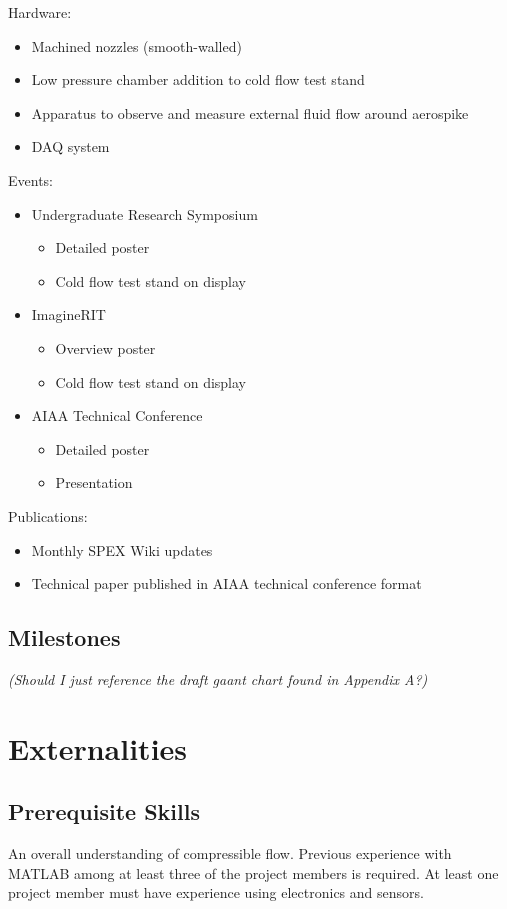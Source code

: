 \documentclass[conference]{IEEEtran} %
\begin{document}
	Hardware:
	\begin{itemize}
		\item Machined nozzles (smooth-walled)
		\item Low pressure chamber addition to cold flow test stand
		\item Apparatus to observe and measure external fluid flow around aerospike
		\item DAQ system
	\end{itemize}
	Events:
	\begin{itemize}
		\item Undergraduate Research Symposium
		\begin{itemize}
			\item Detailed poster
			\item Cold flow test stand on display
		\end{itemize}
		\item ImagineRIT
		\begin{itemize}
			\item Overview poster
			\item Cold flow test stand on display
		\end{itemize}
		\item AIAA Technical Conference
		\begin{itemize}
			\item Detailed poster
			\item Presentation
		\end{itemize}
	\end{itemize}
	Publications:
	\begin{itemize}
		\item Monthly SPEX Wiki updates
		\item Technical paper published in AIAA technical conference format
	\end{itemize}
	
	\subsection{Milestones}
	\label{subsec:milestones}
	\textit{(Should I just reference the draft gaant chart found in Appendix A?)}
	
	\section{Externalities}
	\subsection{Prerequisite Skills}
	An overall understanding of compressible flow. Previous experience with MATLAB among at least three of the project members is required. At least one project member must have experience using electronics and sensors.
	
\end{document}
